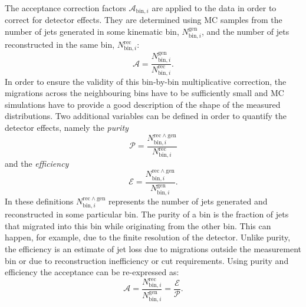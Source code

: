 The acceptance correction factors $\mathcal{A}_{\mathrm{bin},i}$ are applied to the data in order to correct for detector effects. They are determined using MC samples from the number of jets generated in some kinematic bin, $N_{\mathrm{bin},i}^{\mathrm{gen}}$, and the number of jets reconstructed in the same bin, $N_{\mathrm{bin},i}^{\mathrm{rec}}$:
\begin{equation}
 \mathcal{A}=\frac{N_{\mathrm{bin},i}^{\mathrm{gen}}}{N_{\mathrm{bin},i}^{\mathrm{rec}}}.
 \label{eq:accdef}
\end{equation}
In order to ensure the validity of this bin-by-bin multiplicative correction, the migrations across the neighbouring bins have to be sufficiently small and MC simulations have to provide a good description of the shape of the measured distributions. Two additional variables can be defined in order to quantify the detector effects,  namely the \emph{purity}
\begin{equation}
 \mathcal{P}=\frac{N_{\mathrm{bin},i}^{\mathrm{rec \wedge gen}}}{N_{\mathrm{bin},i}^{\mathrm{rec}}}
\label{eq:puritydef}
\end{equation}
and the \emph{efficiency}
\begin{equation}
 \mathcal{E}=\frac{N_{\mathrm{bin},i}^{\mathrm{rec \wedge gen}}}{N_{\mathrm{bin},i}^{\mathrm{gen}}}.
\label{eq:efficiencydef}
\end{equation}
In these definitions $N_{\mathrm{bin},i}^{\mathrm{rec \wedge gen}}$ represents the number of jets generated and reconstructed in some particular bin. The purity of a bin is the fraction of jets that migrated into this bin while originating from the other bin. This can happen, for example, due to the finite resolution of the detector. Unlike purity, the efficiency is an estimate of jet loss due to migrations outside the measurement bin or due to reconstruction inefficiency or cut requirements. Using purity and efficiency the acceptance can be re-expressed as:
\begin{equation}
  \mathcal{A} = \frac{N_{\mathrm{bin},i}^{\mathrm{rec}}}{N_{\mathrm{bin},i}^{\mathrm{gen}}} = \frac{\mathcal{E}}{\mathcal{P}}.
\end{equation}

